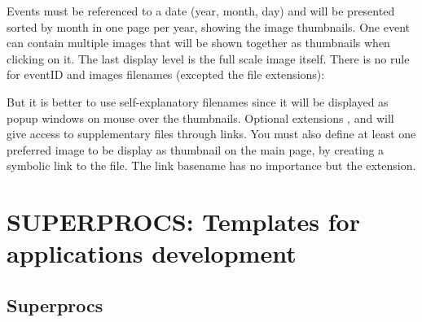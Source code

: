 Events must be referenced to a date (year, month, day) and will be presented sorted by month in one page per year, showing the image thumbnails. One event can contain multiple images that will be shown together as thumbnails when clicking on it. The last display level is the full scale image itself. There is no rule for eventID and images filenames (excepted the file extensions):

\hspace{15pt}

But it is better to use self-explanatory filenames since it will be displayed as popup windows on mouse over the thumbnails. Optional extensions ,  and  will give access to supplementary files through links. You must also define at least one preferred image to be display as thumbnail on the main page, by creating a symbolic link to the  file. The link basename has no importance but the extension.

\hspace{15pt}


\section{SUPERPROCS: Templates for applications development}

\subsection{Superprocs}


\subsubsection{}
